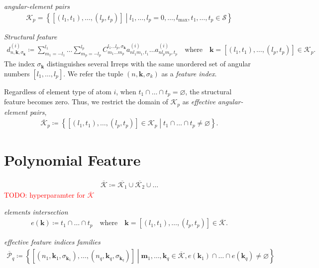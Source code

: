 \documentclass[a4paper, 11pt]{article}
\theoremstyle{definition}
\newcommand{\term}[1]{\textit{#1}}
\newcommand{\todo}[1]{\textcolor{red}{TODO: #1}}
\newcommand{\relmiddle}[1]{\mathrel{}\middle#1\mathrel{}}
\newcommand{\set}[2]{\left\{ #1 \relmiddle| #2 \right\}}
\begin{document}
\term{angular-element pairs}
\begin{align}
  \mathcal{K}_{p}
    = \set{ [ (l_{1}, t_{1}), \dots, (l_{p}, t_{p}) ] }{ l_{1}, \dots, l_{p} = 0, \dots, l_{\mathrm{max}}, t_{1}, \dots, t_{p} \in \mathcal{S} }
\end{align}

\term{Structural feature}
\begin{align}
  d^{(i)}_{n, \mathbf{k}, \sigma_{\mathbf{k}}}
  \coloneqq \sum_{m_{1}=-l_{1}}^{l_{1}} \dots \sum_{m_{p}=-l_{p}}^{l_{p}} C^{l_{1} \dots l_{p}, \sigma_{\mathbf{k}} }_{m_{1} \dots m_{p}} a^{(i)}_{nl_{1}m_{1}, t_{1}} \dots a^{(i)}_{n l_{p} m_{p}, t_{p}}
  \quad \mbox{where} \quad \mathbf{k} = [(l_{1}, t_{1}), \dots, (l_{p}, t_{p}) ] \in \mathcal{K}_{p}.
\end{align}
The index $\sigma_{\mathbf{k}}$ distinguishes several Irreps with the same unordered set of angular numbers $[l_{1}, \dots, l_{p}]$.
We refer the tuple $(n, \mathbf{k}, \sigma_{k})$ as a \term{feature index}.

Regardless of element type of atom $i$, when $t_{1} \cap \dots \cap t_{p} = \varnothing$, the structural feature becomes zero.
Thus, we restrict the domain of $\mathcal{K}_{p}$ as \term{effective angular-element pairs},
\begin{align}
  \overline{\mathcal{K}}_{p}
  \coloneqq
  \set{ [(l_{1}, t_{1}), \dots, (l_{p}, t_{p}) ] \in \mathcal{K}_{p} }{ t_{1} \cap \dots \cap t_{p} \neq \varnothing }.
\end{align}

\section{Polynomial Feature}

\begin{align}
  \overline{\mathcal{K}} \coloneqq \overline{\mathcal{K}_{1}} \cup \overline{\mathcal{K}_{2}} \cup \dots
\end{align}
\todo{hyperparamter for $\overline{\mathcal{K}}$}

\term{elements intersection}
\begin{align}
  e(\mathbf{k}) \coloneqq t_{1} \cap \dots \cap t_{p} \quad \mbox{where} \quad \mathbf{k} = [(l_{1}, t_{1}), \dots, (l_{p}, t_{p})] \in \overline{\mathcal{K}}.
\end{align}

\term{effective feature indices families}
\begin{align}
  \overline{\mathcal{P}}_{q}
  \coloneqq \set{[(n_{1}, \mathbf{k}_{1}, \sigma_{\mathbf{k}_{1}}), \dots, (n_{q}, \mathbf{k}_{q}, \sigma_{\mathbf{k}_{q}})]}{ \mathbf{m}_{1}, \dots, \mathbf{k}_{q} \in \overline{\mathcal{K}}, e(\mathbf{k}_{1}) \cap \dots \cap e(\mathbf{k}_{q}) \neq \varnothing }
\end{align}
\end{document}
